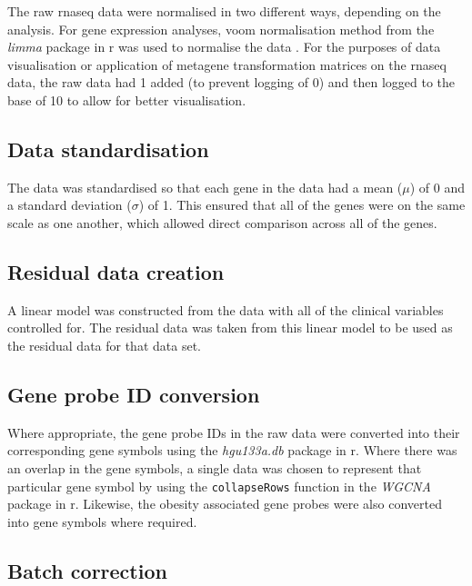 The raw \gls{rnaseq} data were normalised in two different ways, depending on the analysis.
For gene expression analyses, voom normalisation method from the \textit{limma} package in \gls{r} was used to normalise the data \citep{Ritchie2015}.
For the purposes of data visualisation or application of metagene transformation matrices on the \gls{rnaseq} data, the raw data had 1 added (to prevent logging of 0) and then logged to the base of 10 to allow for better visualisation.

\subsection{Data standardisation}
\label{sub:data_standardisation}




The data was standardised so that each gene in the data had a mean ($\mu$) of 0 and a standard deviation ($\sigma$) of 1.
This ensured that all of the genes were on the same scale as one another, which allowed direct comparison across all of the genes.

\subsection{Residual data creation}
\label{sub:residual_data_creation}

A linear model was constructed from the data with all of the clinical variables controlled for.
The residual data was taken from this linear model to be used as the residual data for that data set.

\subsection{Gene probe ID conversion}
\label{sub:gene_probe_id_conversion}

Where appropriate, the gene probe IDs in the raw data were converted into their corresponding gene symbols using the \textit{hgu133a.db} package in \gls{r}.
Where there was an overlap in the gene symbols, a single data was chosen to represent that particular gene symbol by using the \texttt{collapseRows} function in the \textit{WGCNA} package in \gls{r}.
Likewise, the obesity associated gene probes were also converted into gene symbols where required.


\subsection{Batch correction}
\label{sub:batch_correction}

